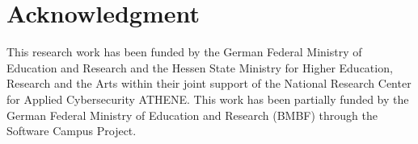 \documentclass[a4paper,conference]{IEEEtran}
\begin{document}
\section*{Acknowledgment}This research work has been funded by the German Federal Ministry of Education and Research and the Hessen State Ministry for Higher Education, Research and the Arts within their joint support of the National Research Center for Applied Cybersecurity ATHENE. This work has been partially funded by the German Federal Ministry of Education and Research (BMBF) through the Software Campus Project.



\newpage
\end{document}
